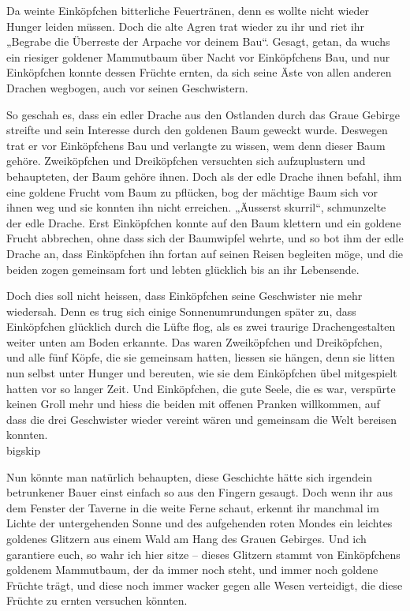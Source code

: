 \documentclass[10pt, a4paper, oneside]{book}
\begin{document}
Da weinte Einköpfchen bitterliche Feuertränen, denn es wollte nicht wieder Hunger leiden müssen. Doch die alte Agren trat wieder zu ihr und riet ihr „Begrabe die Überreste der Arpache vor deinem Bau“. Gesagt, getan, da wuchs ein riesiger goldener Mammutbaum über Nacht vor Einköpfchens Bau, und nur Einköpfchen konnte dessen Früchte ernten, da sich seine Äste von allen anderen Drachen wegbogen, auch vor seinen Geschwistern.



So geschah es, dass ein edler Drache aus den Ostlanden durch das Graue Gebirge streifte und sein Interesse durch den goldenen Baum geweckt wurde. Deswegen trat er vor Einköpfchens Bau und verlangte zu wissen, wem denn dieser Baum gehöre. Zweiköpfchen und Dreiköpfchen versuchten sich aufzuplustern und behaupteten, der Baum gehöre ihnen. Doch als der edle Drache ihnen befahl, ihm eine goldene Frucht vom Baum zu pflücken, bog der mächtige Baum sich vor ihnen weg und sie konnten ihn nicht erreichen. „Äusserst skurril“, schmunzelte der edle Drache. Erst Einköpfchen konnte auf den Baum klettern und ein goldene Frucht abbrechen, ohne dass sich der Baumwipfel wehrte, und so bot ihm der edle Drache an, dass Einköpfchen ihn fortan auf seinen Reisen begleiten möge, und die beiden zogen gemeinsam fort und lebten glücklich bis an ihr Lebensende.



Doch dies soll nicht heissen, dass Einköpfchen seine Geschwister nie mehr wiedersah. Denn es trug sich einige Sonnenumrundungen später zu, dass Einköpfchen glücklich durch die Lüfte flog, als es zwei traurige Drachengestalten weiter unten am Boden erkannte. Das waren Zweiköpfchen und Dreiköpfchen, und alle fünf Köpfe, die sie gemeinsam hatten, liessen sie hängen, denn sie litten nun selbst unter Hunger und bereuten, wie sie dem Einköpfchen übel mitgespielt hatten vor so langer Zeit. Und Einköpfchen, die gute Seele, die es war, verspürte keinen Groll mehr und hiess die beiden mit offenen Pranken willkommen, auf dass die drei Geschwister wieder vereint wären und gemeinsam die Welt bereisen konnten.\\bigskip



Nun könnte man natürlich behaupten, diese Geschichte hätte sich irgendein betrunkener Bauer einst einfach so aus den Fingern gesaugt. Doch wenn ihr aus dem Fenster der Taverne in die weite Ferne schaut, erkennt ihr manchmal im Lichte der untergehenden Sonne und des aufgehenden roten Mondes ein leichtes goldenes Glitzern aus einem Wald am Hang des Grauen Gebirges. Und ich garantiere euch, so wahr ich hier sitze – dieses Glitzern stammt von Einköpfchens goldenem Mammutbaum, der da immer noch steht, und immer noch goldene Früchte trägt, und diese noch immer wacker gegen alle Wesen verteidigt, die diese Früchte zu ernten versuchen könnten.
\end{document}
